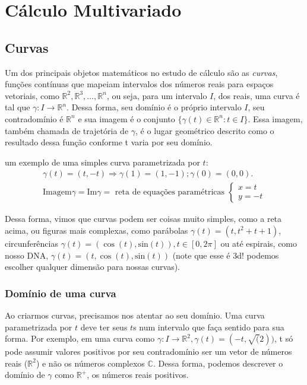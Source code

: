 \documentclass[
  letterpaper,
  DIV=11,
  numbers=noendperiod]{scrreprt}
\begin{document}
\part{Cálculo Multivariado}

\chapter{Curvas}\label{curvas}

Um dos principais objetos matemáticos no estudo de cálculo são as
\emph{curvas}, funções contínuas que mapeiam intervalos dos números
reais para espaços vetoriais, como
\(\mathbb{R}^2, \mathbb{R}^3,\ldots,\mathbb{R}^n\), ou seja, para um
intervalo \(I\), dos reais, uma curva é tal que
\(\gamma : I \rightarrow \mathbb{R}^n\). Dessa forma, seu domínio é o
próprio intervalo \(I\), seu contradomínio é \(\mathbb{R}^n\) e sua
imagem é o conjunto \(\{\gamma(t) \in \mathbb{R}^n : t \in I\}\). Essa
imagem, também chamada de trajetória de \(\gamma\), é o lugar geométrico
descrito como o resultado dessa função conforme t varia por seu domínio.

um exemplo de uma simples curva parametrizada por \(t\): \[
\begin{aligned}
    \gamma(t) = (t, -t) \Rightarrow \gamma(1) = (1, -1); \gamma(0) = (0,0). \\ 
    \mathrm{Imagem}\gamma = \mathrm{Im}\gamma =
    \text{ reta de equações paramétricas } 
    \begin{cases}
        x = t \\
        y = -t
    \end{cases}
\end{aligned}
\]

Dessa forma, vimos que curvas podem ser coisas muito simples, como a
reta acima, ou figuras mais complexas, como parábolas
\(\gamma(t) = (t, t^2 + t + 1)\), circunferências
\(\gamma(t) = (\cos(t),\mathrm{sin}(t)), t \in [0, 2\pi]\) ou até
espirais, como nosso DNA, \(\gamma(t) = (t, \cos(t), \mathrm{sin}(t))\)
(note que esse é 3d! podemos escolher qualquer dimensão para nossas
curvas).

\section{Domínio de uma curva}\label{domuxednio-de-uma-curva}

Ao criarmos curvas, precisamos nos atentar ao seu domínio. Uma curva
parametrizada por \(t\) deve ter seus \(t\)s num intervalo que faça
sentido para sua forma. Por exemplo, em uma curva como
\(\gamma : I \rightarrow \mathbb{R}^2, \gamma(t) = (-t, \sqrt(2))\), t
só pode assumir valores positivos por seu contradomínio ser um vetor de
números reais (\(\mathbb{R}^2\)) e não os números complexos
\(\mathbb{C}\). Dessa forma, podemos descrever o domínio de \(\gamma\)
como \(\mathbb{R}^{+}\), os números reais positivos.
\end{document}

